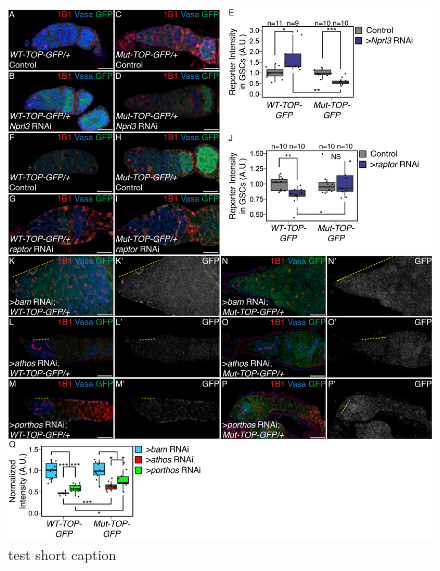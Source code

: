 \documentclass[12pt,oneside]{reedthesis}
\begin{document}
\begin{figure}

{\centering \includegraphics[width=6.5 in,height=8.9375 in]{./figure/Ribosome Biogenesis/Ribosome Biogenesis 6S} 

}

\caption[test short caption]{test short caption}\label{fig:unnamed-chunk-17}
\end{figure}
\end{document}
